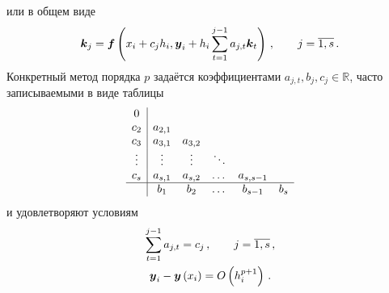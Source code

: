 \documentclass[../document.tex]{subfiles}
\begin{document}
                или в общем виде 
                \begin{equation}
                    \boldsymbol{k}_j=\boldsymbol{f}\left(x_i+c_jh_i,\boldsymbol{y}_i+h_i\sum\limits_{t=1}^{j-1}a_{j,t}\boldsymbol{k}_t\right)\,,\qquad j=\overline{1,s}\,.
                \end{equation}
                Конкретный метод порядка $p$ задаётся коэффициентами $a_{j,t},b_j,c_j\in\mathbb{R}$, часто записываемыми в виде таблицы
                \begin{equation}
                    \begin{array}{c|ccccc}
                        0 & \multicolumn{5}{c}{}\\
                        c_2 & a_{2,1} & \multicolumn{4}{c}{}\\
                        c_3 & a_{3,1} & a_{3,2} & \multicolumn{3}{c}{}\\
                        \vdots & \vdots & \vdots & \ddots & \multicolumn{2}{c}{}\\
                        c_s & a_{s,1} & a_{s,2} & \dots & a_{s,s-1} & \\
                        \hline
                        & b_1 & b_2 & \dots & b_{s-1} & b_s
                    \end{array}
                \end{equation}
                и удовлетворяют условиям
                \begin{gather}
                    \sum\limits_{t=1}^{j-1}a_{j,t}=c_j\,,\qquad j=\overline{1,s}\,,\\
                    \boldsymbol{y}_i-\boldsymbol{y}\left(x_i\right)=O\left(h_i^{p+1}\right)\,.
                \end{gather}
\end{document}
